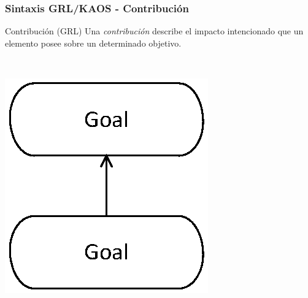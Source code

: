 \documentclass[handout,slidestop,xcolor=pst,dvips,blue]{beamer}
\begin{document}
\begin{frame}[c]
    \frametitle{Sintaxis GRL/KAOS - Contribución}
    \begin{block}{Contribución (GRL)}
        Una \alert{\emph{contribución}} describe el impacto intencionado que un elemento posee sobre un determinado objetivo.
        \ \\
        \ \\
        \begin{columns}[c]
            \begin{column}{0.5\linewidth}
                \centering \includegraphics[width=0.35\columnwidth,keepaspectratio=true]{images/objetivos/contribution(GRL).eps}
            \end{column}
            \begin{column}{0.5\linewidth}
            \end{column}
        \end{columns}
    \end{block}
\end{frame}
\end{document}
